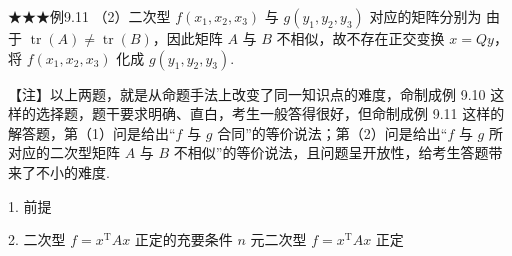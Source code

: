\begin{fcard}{★★★例9.11}
（2）二次型 $f(x_1,x_2,x_3)$ 与 $g(y_1,y_2,y_3)$ 对应的矩阵分别为
由于 $\operatorname{tr}(A)\ne\operatorname{tr}(B)$，因此矩阵 $A$ 与 $B$ 不相似，故不存在正交变换 $x=Qy$，将 $f(x_1,x_2,x_3)$ 化成 $g(y_1,y_2,y_3)$.
\end{fcard}

\begin{fnote}
【注】以上两题，就是从命题手法上改变了同一知识点的难度，命制成例 9.10 这样的选择题，题干要求明确、直白，考生一般答得很好，但命制成例 9.11 这样的解答题，第（1）问是给出“$f$ 与 $g$ 合同”的等价说法；第（2）问是给出“$f$ 与 $g$ 所对应的二次型矩阵 $A$ 与 $B$ 不相似”的等价说法，且问题呈开放性，给考生答题带来了不小的难度.
\end{fnote}


\begin{fcard}{1. 前提}
\end{fcard}


\begin{fcard}{2. 二次型 $f=x^{\mathrm{T}}Ax$ 正定的充要条件}
$n$ 元二次型 $f=x^{\mathrm{T}}Ax$ 正定
\end{fcard}

